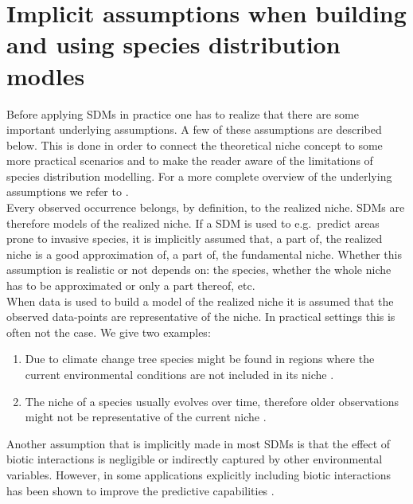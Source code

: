 \section{Implicit assumptions when building and using species distribution modles}
\label{sec:chTheEcologicalNicheConcept:NicheEquilibrium}
Before applying SDMs in practice one has to realize that there are some important underlying assumptions. A few of these assumptions are described below. This is done in order to connect the theoretical niche concept to some more practical scenarios and to make the reader aware of the limitations of species distribution modelling. For a more complete overview of the underlying assumptions we refer to \cite{wiens_niches_2009}.\\

Every observed occurrence belongs, by definition, to the realized niche. SDMs are therefore models of the realized niche. If a SDM is used to e.g.\ predict areas prone to invasive species, it is implicitly assumed that, a part of, the realized niche is a good approximation of, a part of, the fundamental niche. Whether this assumption is realistic or not depends on: the species, whether the whole niche has to be approximated or only a part thereof, etc.\\

When data is used to build a model of the realized niche it is assumed that the observed data-points are representative of the niche. In practical settings this is often not the case. We give two examples:
\begin{enumerate}
\item Due to climate change tree species might be found in regions where the current environmental conditions are not included in its niche \parencite{woodward_impact_1990}.
\item The niche of a species usually evolves over time, therefore older observations might not be representative of the current niche \parencite{pearson_predicting_2003}.
\end{enumerate}

Another assumption that is implicitly made in most SDMs is that the effect of biotic interactions is negligible or indirectly captured by other environmental variables. However, in some applications explicitly including biotic interactions has been shown to improve the predictive capabilities \parencite[e.g.][]{heikkinen_biotic_2007}. \\






